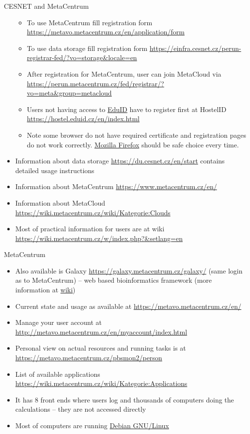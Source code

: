 \documentclass[compress, ucs, xelatex, 11pt, xcolor=svgnames,
  hyperref={
    bookmarks=true,
    unicode=true,
    colorlinks=true,
    pdftitle={Linux, command line and MetaCentrum},
    plainpages=false,
    pdfauthor={Vojtech Zeisek},
    pdfsubject={Course about use of Linux command line, writing shell scripts and using MetaCentrum of CESNET},
    pdfcreator={XeLaTeX},
    pdfkeywords={Linux, GNU, BASH, shell, command line, MetaCentrum},
    linkcolor=DarkRed,
    anchorcolor=DarkBlue,
    citecolor=Indigo,
    filecolor=NavyBlue,
    menucolor=DarkMagenta,
    urlcolor=DarkBlue,
    pdftex},
  url={hyphens, lowtilde} %
  ]{beamer}
\begin{document}
\begin{frame}[allowframebreaks]{CESNET and MetaCentrum}
\begin{itemize}
    \begin{itemize}
      \item To use MetaCentrum fill registration form \url{https://metavo.metacentrum.cz/en/application/form}
      \item To use data storage fill registration form \url{https://einfra.cesnet.cz/perun-registrar-fed/?vo=storage&locale=en}
      \item After registration for MetaCentrum, user can join MetaCloud via \url{https://perun.metacentrum.cz/fed/registrar/?vo=meta&group=metacloud}
      \item Users not having access to \href{https://www.eduid.cz/en/index}{EduID} have to register first at HostelID \url{https://hostel.eduid.cz/en/index.html}
      \item Note some browser do not have required certificate and registration pages do not work correctly. \href{https://www.mozilla.org/firefox/}{Mozilla Firefox} should be safe choice every time.
    \end{itemize}
    \item Information about data storage \url{https://du.cesnet.cz/en/start} contains detailed usage instructions
    \item Information about MetaCentrum \url{https://www.metacentrum.cz/en/}
    \item Information about MetaCloud \url{https://wiki.metacentrum.cz/wiki/Kategorie:Clouds}
    \item Most of practical information for users are at wiki \url{https://wiki.metacentrum.cz/w/index.php?&setlang=en}
  \end{itemize}
\end{frame}

\begin{frame}{MetaCentrum}
  \begin{itemize}
    \item Also available is Galaxy \url{https://galaxy.metacentrum.cz/galaxy/} (same login as to MetaCentrum) -- web based bioinformatics framework (more information at \href{https://wiki.metacentrum.cz/wiki/Galaxy_application}{wiki})
    \item Current state and usage as available at \url{https://metavo.metacentrum.cz/en/}
    \item Manage your user account at \url{http://metavo.metacentrum.cz/en/myaccount/index.html}
    \item Personal view on actual resources and running tasks is at \url{https://metavo.metacentrum.cz/pbsmon2/person}
    \item List of available applications \url{https://wiki.metacentrum.cz/wiki/Kategorie:Applications}
    \item It has 8 front ends where users log and thousands of computers doing the calculations -- they are not accessed directly
    \item Most of computers are running \href{https://www.debian.org/}{Debian GNU/Linux}
  \end{itemize}
\end{frame}
\end{document}
